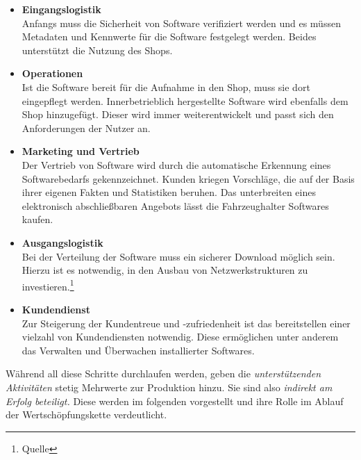 \begin{itemize}
	\item[1.] \textbf{Eingangslogistik}\\
	Anfangs muss die Sicherheit von Software verifiziert werden und es müssen Metadaten und Kennwerte für die Software festgelegt werden. Beides unterstützt die Nutzung des Shops.
	\item[2.] \textbf{Operationen}\\
	Ist die Software bereit für die Aufnahme in den Shop, muss sie dort eingepflegt werden. Innerbetrieblich hergestellte Software wird ebenfalls dem Shop hinzugefügt. Dieser wird immer weiterentwickelt und passt sich den Anforderungen der Nutzer an. 
	\item[3.] \textbf{Marketing und Vertrieb}\\
	Der Vertrieb von Software wird durch die automatische Erkennung eines Softwarebedarfs gekennzeichnet. Kunden kriegen Vorschläge, die auf der Basis ihrer eigenen Fakten und Statistiken beruhen. Das unterbreiten eines elektronisch abschließbaren Angebots lässt die Fahrzeughalter Softwares kaufen.
	\item[4.] \textbf{Ausgangslogistik}\\
	Bei der Verteilung der Software muss ein sicherer Download möglich sein. Hierzu ist es notwendig, in den Ausbau von Netzwerkstrukturen zu investieren.\footnote{Quelle}
	\item[5.] \textbf{Kundendienst}\\
	Zur Steigerung der Kundentreue und -zufriedenheit ist das bereitstellen einer vielzahl von Kundendiensten notwendig. Diese ermöglichen unter anderem das Verwalten und Überwachen installierter Softwares.
\end{itemize}
Während all diese Schritte durchlaufen werden, geben die \textit{unterstützenden Aktivitäten} stetig Mehrwerte zur Produktion hinzu. Sie sind also \textit{indirekt am Erfolg beteiligt.} Diese werden im folgenden vorgestellt und ihre Rolle im Ablauf der Wertschöpfungskette verdeutlicht.
